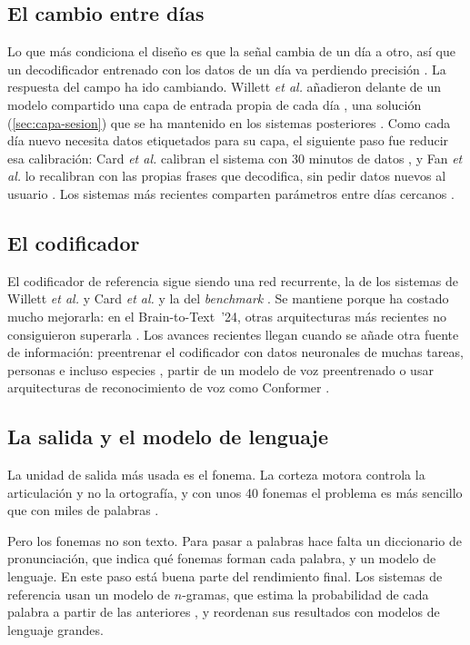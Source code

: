 \subsection{El cambio entre días}

Lo que más condiciona el diseño es que la señal cambia de un día a otro, así que un decodificador entrenado con los datos de un día va perdiendo precisión \cite{sussillo2016}. La respuesta del campo ha ido cambiando. Willett \textit{et al.} añadieron delante de un modelo compartido una capa de entrada propia de cada día \cite{willett2021}, una solución (\cref{sec:capa-sesion}) que se ha mantenido en los sistemas posteriores \cite{willett2023,card2024}. Como cada día nuevo necesita datos etiquetados para su capa, el siguiente paso fue reducir esa calibración: Card \textit{et al.} calibran el sistema con 30 minutos de datos \cite{card2024}, y Fan \textit{et al.} lo recalibran con las propias frases que decodifica, sin pedir datos nuevos al usuario \cite{fan2023corp}. Los sistemas más recientes comparten parámetros entre días cercanos \cite{brainwhisperer}.

\subsection{El codificador}

El codificador de referencia sigue siendo una red recurrente, la de los sistemas de Willett \textit{et al.} y Card \textit{et al.} y la del \textit{benchmark} \cite{willett2023,card2024,b2t25}. Se mantiene porque ha costado mucho mejorarla: en el Brain-to-Text~'24, otras arquitecturas más recientes no consiguieron superarla \cite{b2t24lessons}. Los avances recientes llegan cuando se añade otra fuente de información: preentrenar el codificador con datos neuronales de muchas tareas, personas e incluso especies \cite{crossspecies2025}, partir de un modelo de voz preentrenado \cite{brainwhisperer} o usar arquitecturas de reconocimiento de voz como Conformer \cite{khanday2026}.

\subsection{La salida y el modelo de lenguaje}

La unidad de salida más usada es el fonema. La corteza motora controla la articulación y no la ortografía, y con unos 40 fonemas el problema es más sencillo que con miles de palabras \cite{willett2023}.

Pero los fonemas no son texto. Para pasar a palabras hace falta un diccionario de pronunciación, que indica qué fonemas forman cada palabra, y un modelo de lenguaje. En este paso está buena parte del rendimiento final. Los sistemas de referencia usan un modelo de $n$-gramas, que estima la probabilidad de cada palabra a partir de las anteriores \cite{jurafsky2026slp}, y reordenan sus resultados con modelos de lenguaje grandes.

